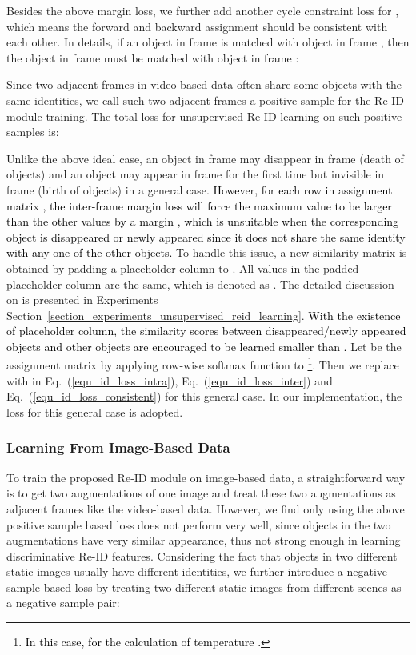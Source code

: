 \documentclass[final,1p,times,twocolumn]{elsarticle}
\newcommand{\Sref}[1]{Section~\ref{#1}}
\newcommand{\eref}[1]{Eq.~(\ref{#1})}
\newcommand{\qiankun}[1]{\textcolor{black}{#1}}
\begin{document}
	Besides the above margin loss, we further add another cycle constraint loss  for , which means the forward and backward assignment should be consistent with each other. In details, if an object  in frame  is matched with object  in frame , then the object  in frame  must be matched with object  in frame :
	
	
	Since two adjacent frames in video-based data often share some objects with the same identities, we call such two adjacent frames a positive sample for the Re-ID module training. The total loss for unsupervised Re-ID learning on such positive samples is:
	
	
	
	Unlike the above ideal case, an object in frame  may disappear in frame  (death of objects) and an object may appear in frame  for the first time but invisible in frame  (birth of objects) in a general case. 
	\qiankun{However, for each row in assignment matrix , the inter-frame margin loss  will force the maximum value to be larger than the other values by a margin , which is unsuitable when the corresponding object is disappeared or newly appeared since it does not share the same identity with any one of the other objects.}
	To handle this issue, a new similarity matrix  is obtained by padding a placeholder column to . All values in the padded placeholder column are the same, which is denoted as . The detailed discussion on  is presented in Experiments \Sref{section_experiments_unsupervised_reid_learning}.
	\qiankun{With the existence of placeholder column, the similarity scores between disappeared/newly appeared objects and other objects are encouraged to be learned smaller than .}
	Let  be the assignment matrix by applying row-wise softmax function to  \footnote{\qiankun{In this case,  for the calculation of temperature .}}. Then we replace  with  in \eref{equ_id_loss_intra},  \eref{equ_id_loss_inter} and \eref{equ_id_loss_consistent} for this general case. 
	In our implementation, the loss for this general case is adopted.
	
	
	\subsubsection{Learning From Image-Based Data}
	To train the proposed Re-ID module on image-based data, a straightforward way is to get two augmentations of one image and treat these two augmentations as adjacent frames like the video-based data. However, we find only using the above positive sample based loss does not perform very well, since objects in the two augmentations have very similar appearance, thus not strong enough in learning discriminative Re-ID features. Considering the fact that objects in two different static images usually have different identities, we further introduce a negative sample based loss  by treating two different static images from different scenes as a negative sample pair:
	
\end{document}
